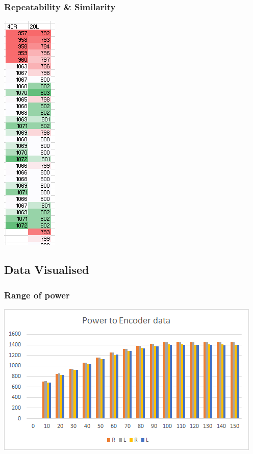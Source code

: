 \documentclass[11pt,a4paper,titlepage]{article}
\begin{document}
	\subsubsection{Repeatability \& Similarity}
	\includegraphics{encoderaReliablity}
	
\subsection{Data Visualised}
	\subsubsection{Range of power}
	
	\includegraphics[width=\textwidth,height=\textheight,keepaspectratio]{enRangeGraph}
	
\end{document}

